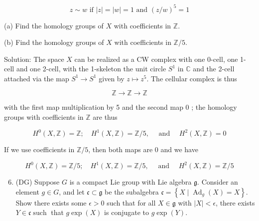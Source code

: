 \documentclass[10pt]{article}
\begin{document}
$$
z \sim w \text { if }|z|=|w|=1 \text { and }(z / w)^{5}=1
$$

(a) Find the homology groups of $X$ with coefficients in $\mathbb{Z}$.

(b) Find the homology groups of $X$ with coefficients in $\mathbb{Z} / 5$.

Solution: The space $X$ can be realized as a CW complex with one 0-cell, one 1-cell and one 2-cell, with the 1-skeleton the unit circle $S^{1}$ in $\mathbb{C}$ and the 2-cell attached via the map $S^{1} \rightarrow S^{1}$ given by $z \mapsto z^{5}$. The cellular complex is thus

$$
\mathbb{Z} \rightarrow \mathbb{Z} \rightarrow \mathbb{Z}
$$

with the first map multiplication by 5 and the second map 0 ; the homology groups with coefficients in $\mathbb{Z}$ are thus

$$
H^{0}(X, \mathbb{Z})=\mathbb{Z} ; \quad H^{1}(X, \mathbb{Z})=\mathbb{Z} / 5, \quad \text { and } \quad H^{2}(X, \mathbb{Z})=0
$$

If we use coefficients in $\mathbb{Z} / 5$, then both maps are 0 and we have

$$
H^{0}(X, \mathbb{Z})=\mathbb{Z} / 5 ; \quad H^{1}(X, \mathbb{Z})=\mathbb{Z} / 5, \quad \text { and } \quad H^{2}(X, \mathbb{Z})=\mathbb{Z} / 5
$$

\begin{enumerate}
  \setcounter{enumi}{5}
  \item (DG) Suppose $G$ is a compact Lie group with Lie algebra $\mathfrak{g}$. Consider an element $g \in G$, and let $\mathfrak{c} \subset \mathfrak{g}$ be the subalgebra $\mathfrak{c}=\left\{X \mid \operatorname{Ad}_{g}(X)=X\right\}$. Show there exists some $\epsilon>0$ such that for all $X \in \mathfrak{g}$ with $|X|<\epsilon$, there exists $Y \in \mathfrak{c} \operatorname{such}$ that $g \exp (X)$ is conjugate to $g \exp (Y)$.
\end{enumerate}
\end{document}
